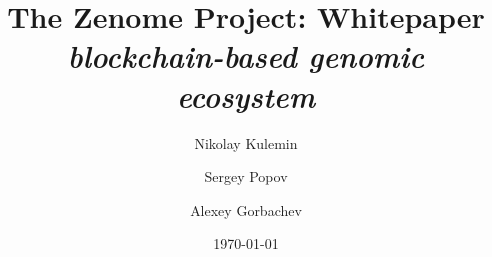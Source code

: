 





\title{\huge The Zenome Project: Whitepaper\\
  {\it blockchain-based genomic ecosystem} }
\date{\today}
\author{Nikolay Kulemin
   \and Sergey Popov
   \and Alexey Gorbachev}


